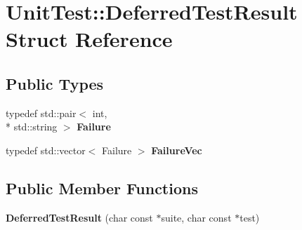 \hypertarget{structUnitTest_1_1DeferredTestResult}{\section{Unit\-Test\-:\-:Deferred\-Test\-Result Struct Reference}
\label{structUnitTest_1_1DeferredTestResult}
}
\subsection*{Public Types}
\begin{DoxyCompactItemize}
\item 
\hypertarget{structUnitTest_1_1DeferredTestResult_a04edde35e5f0d4f8e44c031397071824}{typedef std\-::pair$<$ int, \\*
std\-::string $>$ {\bfseries Failure}}\label{structUnitTest_1_1DeferredTestResult_a04edde35e5f0d4f8e44c031397071824}

\item 
\hypertarget{structUnitTest_1_1DeferredTestResult_a19ffeaef1e3647e09d74a42ece14f862}{typedef std\-::vector$<$ Failure $>$ {\bfseries Failure\-Vec}}\label{structUnitTest_1_1DeferredTestResult_a19ffeaef1e3647e09d74a42ece14f862}

\end{DoxyCompactItemize}
\subsection*{Public Member Functions}
\begin{DoxyCompactItemize}
\item 
\hypertarget{structUnitTest_1_1DeferredTestResult_a6b047fe986a44af3b966df4495f62f8f}{{\bfseries Deferred\-Test\-Result} (char const $\ast$suite, char const $\ast$test)}\label{structUnitTest_1_1DeferredTestResult_a6b047fe986a44af3b966df4495f62f8f}

\end{DoxyCompactItemize}
